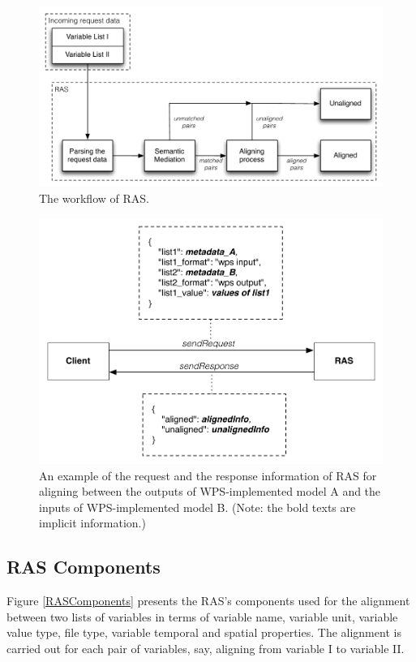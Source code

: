 \documentclass[review]{elsarticle}
\begin{document}
\begin{figure}[!htbp]
\centering
\includegraphics[scale=0.6]{../figures/RASWorkflow.pdf}
\caption{The workflow of RAS.}
\label{rasWorkflow}
\end{figure}

\begin{figure}[!htbp]
\centering
\includegraphics[scale=0.6]{../figures/RASIO.pdf}
\caption{An example of the request and the response information of RAS for aligning between the outputs of WPS-implemented model A and the inputs of WPS-implemented model B. (Note: the bold texts are implicit information.)}
\label{rasWPSIO}
\end{figure}

\subsection{RAS Components} Figure \ref{RASComponents} presents the RAS's components used for the alignment between two lists of variables in terms of  variable name, variable unit, variable value type, file type, variable temporal and spatial properties. The alignment is carried out for each pair of variables, say, aligning from variable I to variable II.
\end{document}
